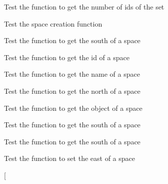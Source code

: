 \begin{DoxyRefList}
\item[\label{test__test000146}%
\Hypertarget{test__test000146}%
Global \hyperlink{set__test_8c_a6959f1b2ac1f7aacdbb199a9028845ac}{test2\+\_\+set\+\_\+get\+\_\+num} ()]Test the function to get the number of ids of the set  
\item[\label{test__test000152}%
\Hypertarget{test__test000152}%
Global \hyperlink{space__test_8c_a012cd3cf37a8d91e2d7098a264c29d65}{test2\+\_\+space\+\_\+create} ()]Test the space creation function  
\item[\label{test__test000175}%
\Hypertarget{test__test000175}%
Global \hyperlink{space__test_8c_a249293510e61c6d5465f52c14343d02b}{test2\+\_\+space\+\_\+get\+\_\+east} ()]Test the function to get the south of a space  
\item[\label{test__test000179}%
\Hypertarget{test__test000179}%
Global \hyperlink{space__test_8c_af9087176b0d3c41d83a17a4918b13e31}{test2\+\_\+space\+\_\+get\+\_\+id} ()]Test the function to get the id of a space  
\item[\label{test__test000167}%
\Hypertarget{test__test000167}%
Global \hyperlink{space__test_8c_aee88ed31c63efc674051a4563aed86e2}{test2\+\_\+space\+\_\+get\+\_\+name} ()]Test the function to get the name of a space  
\item[\label{test__test000171}%
\Hypertarget{test__test000171}%
Global \hyperlink{space__test_8c_a61891c9cebb9d26dc9f149ad8341517c}{test2\+\_\+space\+\_\+get\+\_\+north} ()]Test the function to get the north of a space  
\item[\label{test__test000169}%
\Hypertarget{test__test000169}%
Global \hyperlink{space__test_8c_a0fe857c34f691aaba197d03315c3955f}{test2\+\_\+space\+\_\+get\+\_\+object} ()]Test the function to get the object of a space  
\item[\label{test__test000173}%
\Hypertarget{test__test000173}%
Global \hyperlink{space__test_8c_a40fe07c07c1069023b362a9e506c4c59}{test2\+\_\+space\+\_\+get\+\_\+south} ()]Test the function to get the south of a space  
\item[\label{test__test000177}%
\Hypertarget{test__test000177}%
Global \hyperlink{space__test_8c_af1cf02b01c007aec0684186b39666c32}{test2\+\_\+space\+\_\+get\+\_\+west} ()]Test the function to get the south of a space  
\item[\label{test__test000161}%
\Hypertarget{test__test000161}%
Global \hyperlink{space__test_8c_a5df66d103388be4518c379b224f53770}{test2\+\_\+space\+\_\+set\+\_\+east} ()]Test the function to set the east of a space  
\item[\label{test__test000154}%

\end{DoxyRefList}
